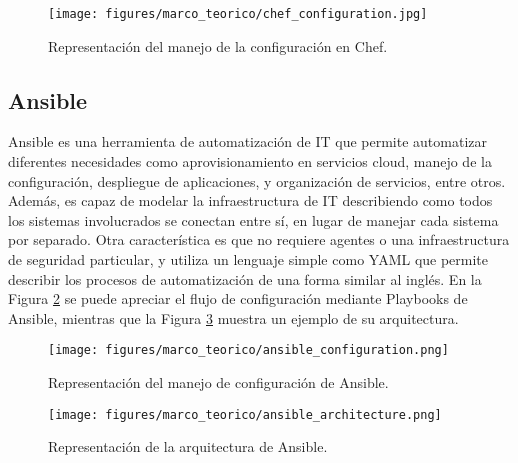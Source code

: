 \begin{figure}[htbp]
    \centering
    \texttt{[image: figures/marco\_teorico/chef\_configuration.jpg]}
    \caption{Representación del manejo de la configuración en Chef. \cite{chefvspuppet}}
    \label{fig:marco:chef_configuration}
\end{figure}

\subsection{Ansible}
Ansible es una herramienta de automatización de IT que permite automatizar diferentes necesidades como aprovisionamiento en servicios cloud, manejo de la configuración, despliegue de aplicaciones, y organización de servicios, entre otros.
Además, es capaz de modelar la infraestructura de IT describiendo como todos los sistemas involucrados se conectan entre sí, en lugar de manejar cada sistema por separado.
Otra característica es que no requiere agentes o una infraestructura de seguridad particular, y utiliza un lenguaje simple como YAML que permite describir los procesos de automatización de una forma similar al inglés. 
En la Figura \ref{fig:marco:ansible_configuration} se puede apreciar el flujo de configuración mediante Playbooks de Ansible, mientras que la Figura \ref{fig:marco:ansible_architecture} muestra un ejemplo de su arquitectura. \cite{ansibleoverview}


\begin{figure}[htbp]
    \centering
    \texttt{[image: figures/marco\_teorico/ansible\_configuration.png]}
    \caption{Representación del manejo de configuración de Ansible. \cite{ansiblearchitecture}}
    \label{fig:marco:ansible_configuration}
\end{figure}

\begin{figure}[htbp]
    \centering
    \texttt{[image: figures/marco\_teorico/ansible\_architecture.png]}
    \caption{Representación de la arquitectura de Ansible. \cite{ansiblearchitecture}}
    \label{fig:marco:ansible_architecture}
\end{figure}

